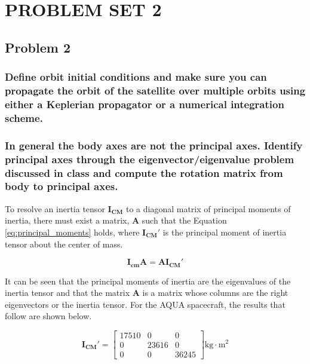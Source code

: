 \section{\Large PROBLEM SET 2}
\subsection{Problem 2}

\subsubsection{Define orbit initial conditions and make sure you can propagate the orbit of the satellite over multiple orbits using either a Keplerian propagator or a numerical integration scheme.}

\subsubsection{In general the body axes are not the principal axes. Identify principal axes through the eigenvector/eigenvalue problem discussed in class and compute the rotation matrix from body to principal axes.} \label{sec:principal_inertia_def_and_calc}

To resolve an inertia tensor $\boldsymbol{I_{CM}}$ to a diagonal matrix of principal moments of inertia, there must exist a matrix, $\boldsymbol{A}$ such that the Equation \ref{eq:principal_moments} holds, where $\boldsymbol{I_{CM}'}$ is the principal moment of inertia tensor about the center of mass.

\begin{equation} \label{eq:principal_moments}
    \boldsymbol{I_{cm} A} = \boldsymbol{A I_{CM}'} 
\end{equation}

It can be seen that the principal moments of inertia are the eigenvalues of the inertia tensor and that the matrix $\boldsymbol{A}$ is a matrix whose columns are the right eigenvectors or the inertia tensor. For the AQUA spacecraft, the results that follow are shown below.

\begin{equation*}
    \boldsymbol{I_{CM}'} = \begin{bmatrix}
        17510 & 0 & 0 \\
        0 & 23616 & 0 \\
        0 & 0 & 36245
    \end{bmatrix} \text{kg} \cdot \text{m}^2
\end{equation*}

